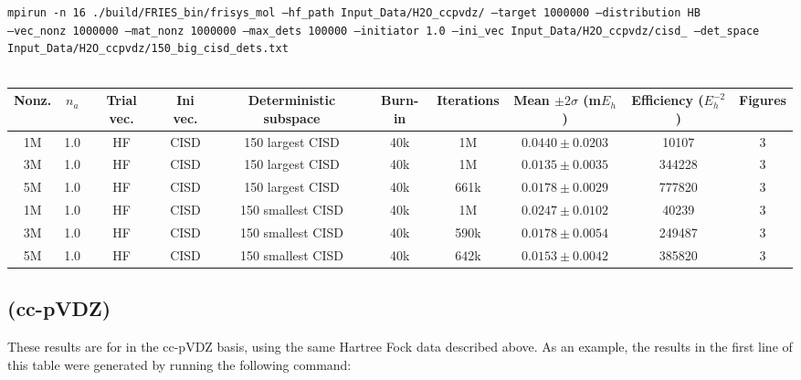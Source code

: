 \documentclass[12pt, landscape]{article}
\begin{document}
\texttt{mpirun -n 16 ./build/FRIES\_bin/frisys\_mol --hf\_path Input\_Data/H2O\_ccpvdz/ --target 1000000 --distribution HB}\\ \texttt{--vec\_nonz 1000000 --mat\_nonz 1000000 --max\_dets 100000 --initiator 1.0 --ini\_vec Input\_Data/H2O\_ccpvdz/cisd\_ --det\_space Input\_Data/H2O\_ccpvdz/150\_big\_cisd\_dets.txt}
\\~\\
\begin{tabular}{c|c|c|c|c|c|c|c|c|c}
Nonz. & $n_a$ & Trial vec. & Ini vec. & Deterministic subspace & Burn-in & Iterations & Mean $\pm 2 \sigma$ (m$E_h$) & Efficiency ($E_h^{-2}$) & Figures \\ \hline
1M & 1.0 & HF & CISD & 150 largest CISD & 40k & 1M & $0.0440 \pm 0.0203$ & 10107 & 3 \\
3M & 1.0 & HF & CISD & 150 largest CISD & 40k & 1M & $0.0135 \pm 0.0035$ & 344228 & 3 \\
5M & 1.0 & HF & CISD & 150 largest CISD & 40k & 661k & $0.0178 \pm 0.0029$ & 777820 & 3 \\
1M & 1.0 & HF & CISD & 150 smallest CISD & 40k & 1M & $0.0247 \pm 0.0102$ & 40239 & 3 \\
3M & 1.0 & HF & CISD & 150 smallest CISD & 40k & 590k & $0.0178 \pm 0.0054$ & 249487 & 3 \\
5M & 1.0 & HF & CISD & 150 smallest CISD & 40k & 642k & $0.0153 \pm 0.0042$ & 385820 & 3 \\
\end{tabular}


\subsection*{ (cc-pVDZ)}
These results are for  in the cc-pVDZ basis, using the same Hartree Fock data described above. As an example, the results in the first line of this table were generated by running the following command:
\end{document}

